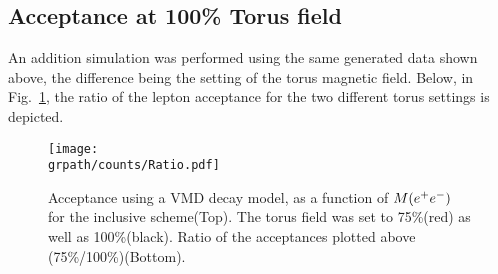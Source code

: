\subsection{Acceptance at 100\% Torus field}
An addition simulation was performed using the same generated data shown above, the difference being the setting of the torus magnetic field. Below, in Fig.~\ref{fig:ratio}, the ratio of the lepton acceptance for the two different torus settings is depicted.
\begin{figure}[h!]\begin{center}
 		\texttt{[image: \\grpath/counts/Ratio.pdf]}
 		\caption[Acceptance, as a function of $M(\epem)$]{\label{fig:ratio}{Acceptance using a VMD decay model, as a function of $M(\epem)$ for the inclusive scheme(Top). The torus field was set to 75\%(red) as well as 100\%(black). Ratio of the acceptances plotted above (75\%/100\%)(Bottom). }}
\end{center}\end{figure}
\FloatBarrier
